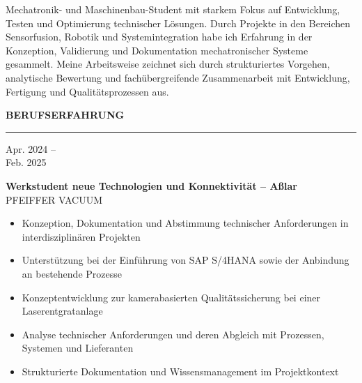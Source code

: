 \documentclass[11pt,a4paper]{article}
\newcommand{\sectionhead}[1]{%
  \vspace{1.1em}
  {\large\bfseries\color{accent}\MakeUppercase{#1}}\\[-0.35em]
  {\color{accent!50}\rule{\linewidth}{0.5pt}}\vspace{0.5em}}
\newcommand{\entry}[4]{%
  \noindent
  \begin{minipage}[t]{2.9cm}\raggedright\small\color{lightgray}#1\end{minipage}%
  \hspace{0.3cm}%
  \begin{minipage}[t]{\dimexpr\linewidth-3.2cm\relax}
    {\normalsize\bfseries\color{black!90}#2}\\[-0.1em]
    {\small\color{accent}#3}
    \begin{itemize}[leftmargin=1.1em,itemsep=0.1em,topsep=0.3em,parsep=0pt,label={\tiny$\bullet$}]
      \small #4
    \end{itemize}
  \end{minipage}\par\vspace{0.55em}}
\begin{document}

\vspace*{2.7cm}

{\small\linespread{1.08}\selectfont
Mechatronik- und Maschinenbau-Student mit starkem Fokus auf Entwicklung, Testen und Optimierung
technischer Lösungen. Durch Projekte in den Bereichen Sensorfusion, Robotik und Systemintegration habe ich
Erfahrung in der Konzeption, Validierung und Dokumentation mechatronischer Systeme gesammelt. Meine
Arbeitsweise zeichnet sich durch strukturiertes Vorgehen, analytische Bewertung und fachübergreifende
Zusammenarbeit mit Entwicklung, Fertigung und Qualitätsprozessen aus.\par}

\sectionhead{Berufserfahrung}

\entry{Apr. 2024 --\\ Feb. 2025}
{Werkstudent neue Technologien und Konnektivität -- Aßlar}
{PFEIFFER VACUUM}
{\item Konzeption, Dokumentation und Abstimmung technischer Anforderungen in interdisziplinären Projekten
 \item Unterstützung bei der Einführung von SAP S/4HANA sowie der Anbindung an bestehende Prozesse
 \item Konzeptentwicklung zur kamerabasierten Qualitätssicherung bei einer Laserentgratanlage
 \item Analyse technischer Anforderungen und deren Abgleich mit Prozessen, Systemen und Lieferanten
 \item Strukturierte Dokumentation und Wissensmanagement im Projektkontext}
\end{document}

